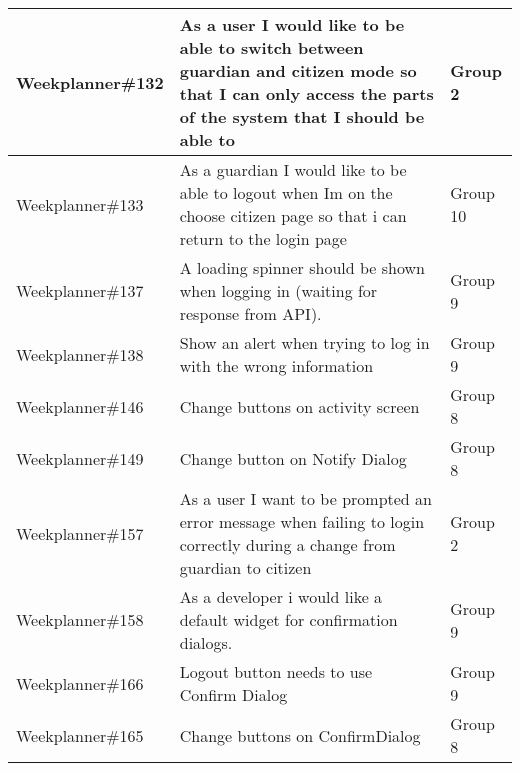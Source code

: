 \begin{longtable}{|p{2.8cm}|p{8cm}|p{2cm}|}
    Weekplanner\#132 & As a user I would like to be able to switch between guardian and citizen mode so that I can only access the parts of the system that I should be able to                            & Group 2           \\ \hline
    Weekplanner\#133 & As a guardian I would like to be able to logout when Im on the choose citizen page so that i can return to the login page                                                              & Group 10           \\ \hline
    Weekplanner\#137 & A loading spinner should be shown when logging in (waiting for response from API).                                                                                                    & Group 9            \\ \hline
    Weekplanner\#138 & Show an alert when trying to log in with the wrong information                                                                                                                         & Group 9           \\ \hline
    Weekplanner\#146 & Change buttons on activity screen                                                                                                                                                    & Group 8          \\ \hline
    Weekplanner\#149 & Change button on Notify Dialog                                                                                                                                                        & Group 8           \\ \hline
    Weekplanner\#157 & As a user I want to be prompted an error message when failing to login correctly during a change from guardian to citizen                                                             & Group 2            \\ \hline
    Weekplanner\#158 & As a developer i would like a default widget for confirmation dialogs.                                                                                                                  & Group 9           \\ \hline
    Weekplanner\#166 & Logout button needs to use Confirm Dialog                                                                                                                                             & Group 9           \\ \hline
    Weekplanner\#165 & Change buttons on ConfirmDialog                                                                                                                                                        & Group 8           \\ \hline

\end{longtable}

